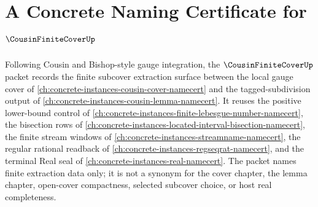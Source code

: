 \chapter{A Concrete Naming Certificate for $\CousinFiniteCoverUp$}
\label{ch:concrete-instances-cousin-finite-cover-namecert}

Following Cousin and Bishop-style gauge integration, the $\CousinFiniteCoverUp$ packet records the finite subcover extraction surface between the local gauge cover of \autoref{ch:concrete-instances-cousin-cover-namecert} and the tagged-subdivision output of \autoref{ch:concrete-instances-cousin-lemma-namecert}. It reuses the positive lower-bound control of \autoref{ch:concrete-instances-finite-lebesgue-number-namecert}, the bisection rows of \autoref{ch:concrete-instances-located-interval-bisection-namecert}, the finite stream windows of \autoref{ch:concrete-instances-streamname-namecert}, the regular rational readback of \autoref{ch:concrete-instances-regseqrat-namecert}, and the terminal Real seal of \autoref{ch:concrete-instances-real-namecert}. The packet names finite extraction data only; it is not a synonym for the cover chapter, the lemma chapter, open-cover compactness, selected subcover choice, or host real completeness.

